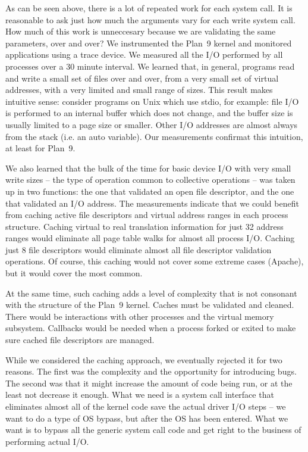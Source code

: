 \documentclass[a4,10pt,preprint]{sigplanconf}
\begin{document}
As can be seen above, there is a lot of repeated work for each system call. It is reasonable to ask just how much the arguments vary for each write system call. How much of this work is unneccesary because we are validating the same parameters, over and over? 
We instrumented the Plan~9 kernel and monitored 
applications using  a trace device\cite{iwp9:tracedevice}. We measured all the I/O performed by all processes over 
a 30 minute interval. We learned that, in general, programs read and write a small 
set of files over and over, from a very small set of virtual addresses, with a very limited and small range of sizes. This result makes intuitive sense: consider programs on Unix which use stdio, for example: file I/O is performed 
to an internal buffer which does not change, and the buffer size is usually limited to a page size or smaller. Other I/O addresses are almost always from the stack (i.e. an auto variable). Our measurements confirmat this intuition, at least for Plan~9. 

We also learned that the bulk of the time for basic device I/O with very small write sizes -- the type of operation common to collective operations -- was taken up in two functions: the one that validated an open file descriptor, and the one that validated an I/O address. 
The measurements indicate that we could benefit from caching active file descriptors and virtual address ranges in each process structure. Caching virtual to real translation information for just 32 address ranges would eliminate all page table walks for almost all process I/O. Caching just 8 file descriptors would eliminate almost all file descriptor validation operations. Of course, this caching would not cover some extreme cases (Apache), but it would cover the most common. 


At the same time, such caching adds a level of complexity that is not consonant with the structure of the Plan~9 kernel. Caches must be validated and cleaned. There would be interactions with other processes and the virtual memory subsystem. Callbacks would be needed when a process forked or exited to make sure cached file descriptors are managed. 

While we considered the caching approach, we eventually rejected it for two reasons. The first was the complexity and the opportunity for introducing bugs. The second was that it might increase the amount of code being run, or at the least not decrease it enough. What we need is a system call interface that eliminates almost all of the kernel code save the actual driver I/O steps -- we want to do a type of OS bypass, but after the OS has been entered. What we want is to bypass all the generic system call code and get right to the business of performing actual I/O. 
\end{document}
